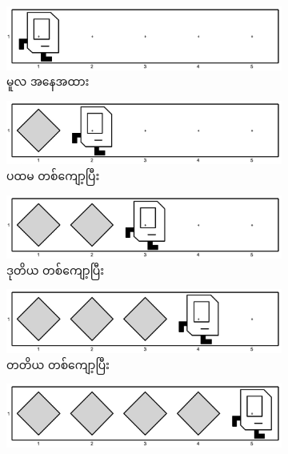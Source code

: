 \begin{figure}[thb!]
    \newcommand{\figpctw}{0.49}
    \begin{subfigure}[t]{{\figpctw}\textwidth}
        \includegraphics[scale=0.15]{images/ch02/mrofb/before.jpg}
        \caption{မူလ အနေအထား}    
    \end{subfigure}
    \begin{subfigure}[t]{{\figpctw}\textwidth}
        \includegraphics[scale=0.15]{images/ch02/mrofb/1st_iter.jpg}
        \caption{ပထမ တစ်ကျော့ပြီး}    
    \end{subfigure}
    \begin{subfigure}[t]{{\figpctw}\textwidth}
        \includegraphics[scale=0.15]{images/ch02/mrofb/2nd_iter.jpg}
        \caption{ဒုတိယ တစ်ကျော့ပြီး}    
    \end{subfigure}
    \begin{subfigure}[t]{{\figpctw}\textwidth}
        \includegraphics[scale=0.15]{images/ch02/mrofb/3rd_iter.jpg}
        \caption{တတိယ တစ်ကျော့ပြီး}    
    \end{subfigure}
    \begin{subfigure}[t]{{\figpctw}\textwidth}
        \includegraphics[scale=0.15]{images/ch02/mrofb/4th_iter.jpg}

\end{subfigure}
\end{figure}
